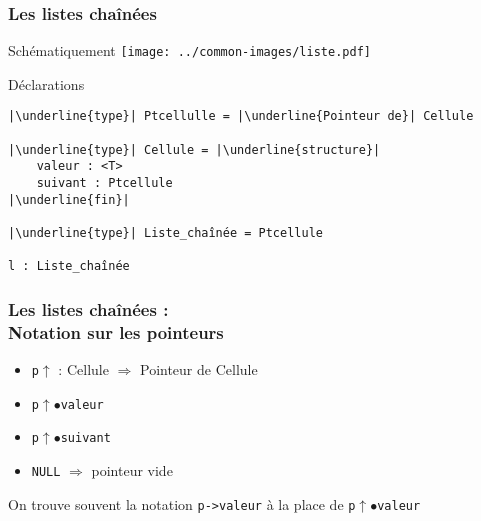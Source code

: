 \documentclass[table,handout,tikz,12pt,svgnames]{beamer}
\begin{document}
\begin{frame}[fragile=singleslide]
	\frametitle{Les listes chaînées}
	\begin{block}{Schématiquement}
			\vspace{0.3cm}
			{\texttt{[image: ../common-images/liste.pdf]}}
	\end{block}
	\begin{block}{Déclarations}
		\begin{verbatim}
|\underline{type}| Ptcellulle = |\underline{Pointeur de}| Cellule

|\underline{type}| Cellule = |\underline{structure}|
	valeur : <T>
	suivant : Ptcellule
|\underline{fin}|

|\underline{type}| Liste_chaînée = Ptcellule

l : Liste_chaînée
		\end{verbatim}
	\end{block}
\end{frame}


\begin{frame}[fragile=singleslide]
	\frametitle{Les listes chaînées :\\ Notation sur les pointeurs}
	\begin{block}{} %
		\begin{itemize}
			\item \texttt{p$\uparrow$} : Cellule  $\Rightarrow$ Pointeur de Cellule
			\item \texttt{p$\uparrow$$\bullet$valeur}
			\item \texttt{p$\uparrow$$\bullet$suivant}
			\item \texttt{NULL} $\Rightarrow$ pointeur vide
		\end{itemize}
	\end{block}
	\vspace{1cm}
	\begin{block}{On trouve souvent la notation \texttt{p->valeur} à la place de \texttt{p$\uparrow$$\bullet$valeur}} %
	\end{block}
\end{frame}
\end{document}
